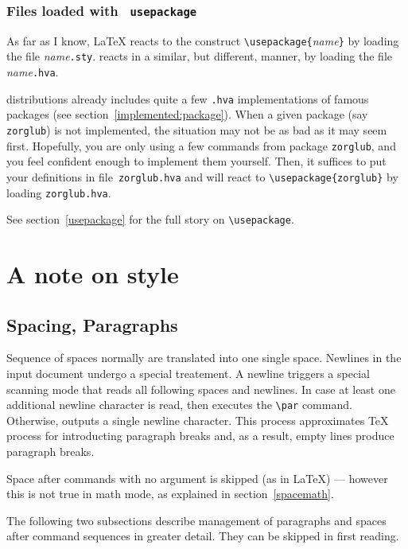 \subsubsection{Files \label{usepackage:both}loaded with \texttt{ usepackage}}
As far as I know, \LaTeX{} reacts to the construct
\verb+\usepackage{+\textit{name}\verb+}+ by loading the file
\textit{name}\texttt{.sty}.
\hevea{} reacts in a similar, but different, manner, by
loading the file \textit{name}\texttt{.hva}.

\hevea{} distributions already includes quite a few \texttt{.hva}
implementations of famous packages (see section~\ref{implemented:package}).
When a given package (say  \texttt{zorglub}) is not implemented, the
situation may not be as bad as it may seem first.
Hopefully, you are only using a few commands from package
\texttt{zorglub}, and you feel confident enough to implement
them yourself.
Then, it suffices to put your definitions in file~\texttt{zorglub.hva}
and \hevea{} will react to \verb+\usepackage{zorglub}+ by loading
\texttt{zorglub.hva}.

See section~\ref{usepackage} for the full story on \verb+\usepackage+.


\section{A note on style}

\subsection{Spacing, Paragraphs}
Sequence of spaces normally are translated into one single space.
Newlines in the input document undergo a special treatement.
A newline triggers a special scanning mode that reads all following
spaces and newlines. In case at least one additional newline character
is read, then \hevea{} executes the \verb+\par+ command.
Otherwise, \hevea{} outputs a single newline character.
This process approximates \TeX{} process for introducting paragraph
breaks and, as a result, empty lines produce paragraph breaks.

Space after commands with no argument is skipped (as in \LaTeX{}) ---
however this is not true in math mode, as explained in
section~\ref{spacemath}.

The following two subsections describe management of paragraphs and
spaces after command sequences in greater detail.
They can be skipped in first reading.

